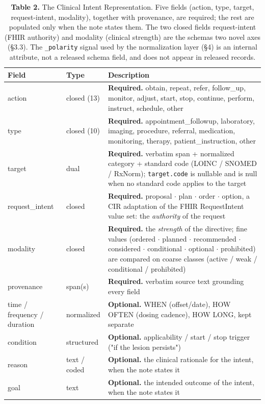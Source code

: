 \documentclass[3p,twocolumn]{elsarticle}
\begin{document}
\begin{table}[ht]
\centering
\small\setlength{\tabcolsep}{4pt}%
\setlength{\tabcolsep}{4pt}
\begin{tabularx}{\linewidth}{>{\hsize=0.536\hsize\raggedright\arraybackslash}X >{\hsize=0.515\hsize\raggedright\arraybackslash}X >{\hsize=1.950\hsize\raggedright\arraybackslash}X}
\toprule
Field & Type & Description \\
\midrule
action & closed (13) & \textbf{Required.} obtain, repeat, refer, follow\_\allowbreak{}up, monitor, adjust, start, stop, continue, perform, instruct, schedule, other \\
type & closed (10) & \textbf{Required.} appointment\_\allowbreak{}followup, laboratory, imaging, procedure, referral, medication, monitoring, therapy, patient\_\allowbreak{}instruction, other \\
target & dual & \textbf{Required.} verbatim span + normalized category + standard code (LOINC / SNOMED / RxNorm); \texttt{target.code} is nullable and is null when no standard code applies to the target \\
request\_\allowbreak{}intent & closed & \textbf{Required.} proposal $\cdot$ plan $\cdot$ order $\cdot$ option, a CIR adaptation of the FHIR RequestIntent value set: the \emph{authority} of the request \\
modality & closed & \textbf{Required.} the \emph{strength} of the directive; fine values (ordered $\cdot$ planned $\cdot$ recommended $\cdot$ considered $\cdot$ conditional $\cdot$ optional $\cdot$ prohibited) are compared on coarse classes (active / weak / conditional / prohibited) \\
provenance & span(s) & \textbf{Required.} verbatim source text grounding every field \\
time / frequency / duration & normalized & \textbf{Optional.} WHEN (offset/date), HOW OFTEN (dosing cadence), HOW LONG, kept separate \\
condition & structured & \textbf{Optional.} applicability / start / stop trigger ("if the lesion persists") \\
reason & text / coded & \textbf{Optional.} the clinical rationale for the intent, when the note states it \\
goal & text & \textbf{Optional.} the intended outcome of the intent, when the note states it \\
\bottomrule
\end{tabularx}
\caption{\textbf{Table 2.} The Clinical Intent Representation. Five fields (action, type, target, request-intent, modality), together with provenance, are required; the rest are populated only when the note states them. The two closed fields request-intent (FHIR authority) and modality (clinical strength) are the schema\textquotesingle s two novel axes (§3.3). The \texttt{\_polarity} signal used by the normalization layer (§4) is an internal attribute, not a released schema field, and does not appear in released records.}
\end{table}
\end{document}
